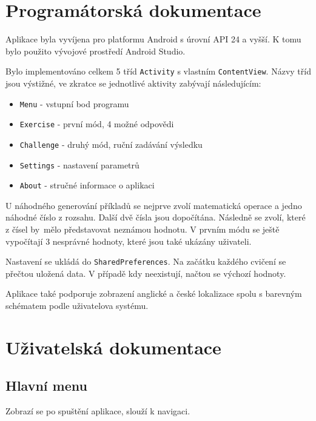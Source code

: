 \documentclass[12pt]{report}
\begin{document}
	\chapter{Programátorská dokumentace}
	Aplikace byla vyvíjena pro platformu Android s úrovní API 24 a vyšší. K tomu bylo použito vývojové prostředí Android Studio.

	Bylo implementováno celkem 5 tříd \texttt{Activity} s vlastním \texttt{ContentView}. Názvy tříd jsou výstižné, ve zkratce se jednotlivé aktivity zabývají následujícím:
	\begin{itemize}
		\item \texttt{Menu} - vstupní bod programu
		\item \texttt{Exercise} - první mód, 4 možné odpovědi
		\item \texttt{Challenge} - druhý mód, ruční zadávání výsledku
		\item \texttt{Settings} - nastavení parametrů
		\item \texttt{About} - stručné informace o aplikaci
	\end{itemize}

	U náhodného generování příkladů se nejprve zvolí matematická operace a jedno náhodné číslo z rozsahu. Další dvě čísla jsou dopočítána. Následně se zvolí, které z čísel by~mělo představovat neznámou hodnotu. V prvním módu se ještě vypočítají 3 nesprávné hodnoty, které jsou také ukázány uživateli.
	
	Nastavení se ukládá do \texttt{SharedPreferences}. Na začátku každého cvičení se přečtou uložená data. V případě kdy neexistují, načtou se výchozí hodnoty.
	
	Aplikace také podporuje zobrazení anglické a české lokalizace spolu s barevným schématem podle uživatelova systému. 

	\chapter{Uživatelská dokumentace}
	\section{Hlavní menu}	
	Zobrazí se po spuštění aplikace, slouží k navigaci.
	
\end{document}
